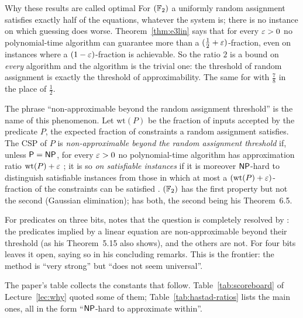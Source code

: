 \begin{bigpicture}{Why these results are called optimal}
For $(\mathbb{F}_2)$ a uniformly random assignment satisfies exactly half of the equations, whatever the system is; there is no instance on which guessing does worse.  Theorem~\ref{thm:e3lin} says that for every $\varepsilon>0$ no polynomial-time algorithm can guarantee more than a $(\tfrac12+\varepsilon)$-fraction, even on instances where a $(1-\varepsilon)$-fraction is achievable.
So the ratio $2$ is a bound on \emph{every} algorithm and the algorithm is the trivial one: the threshold of random assignment is exactly the threshold of approximability.
The same for  with $\tfrac78$ in the place of $\tfrac12$.

The phrase ``non-approximable beyond the random assignment threshold'' is the name of this phenomenon.  Let $\mathrm{wt}(P)$ be the fraction of inputs accepted by the predicate $P$, \ie the expected fraction of constraints a random assignment satisfies.  The CSP of $P$ is \emph{non-approximable beyond the random assignment threshold} if, unless $\mathsf{P}=\mathsf{NP}$, for every $\varepsilon>0$ no polynomial-time algorithm has approximation ratio $\mathrm{wt}(P)+\varepsilon$ \cite[Definition~2.16]{Hastad01}; it is so \emph{on satisfiable instances} if it is moreover $\mathsf{NP}$-hard to distinguish satisfiable instances from those in which at most a $(\mathrm{wt}(P)+\varepsilon)$-fraction of the constraints can be satisfied \cite[Definition~2.17]{Hastad01}.
$(\mathbb{F}_2)$ has the first property but not the second (Gaussian elimination);  has both, the second being his Theorem~6.5.
\end{bigpicture}

\noindent
For predicates on three bits, \cite{Hastad01} notes that the question is completely resolved by \citet{Zwick98}: the predicates implied by a linear equation are non-approximable beyond their threshold (as his Theorem~5.15 also shows), and the others are not.  For four bits \cite{Hastad01} leaves it open, saying so in his concluding remarks.  This is the frontier: the method is ``very strong'' but ``does not seem universal''.

The paper's table collects the constants that follow.  Table~\ref{tab:scoreboard} of Lecture~\ref{lec:why} quoted some of them; Table~\ref{tab:hastad-ratios} lists the main ones, all in the form ``$\mathsf{NP}$-hard to approximate within''.

